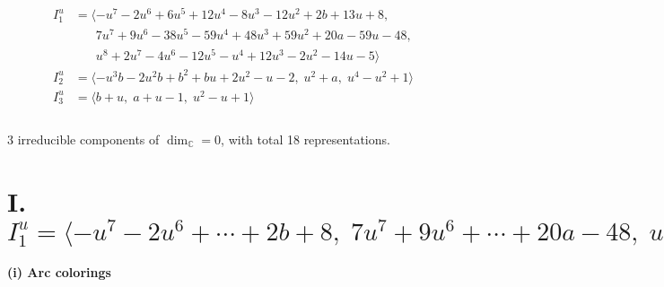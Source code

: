 \documentclass[1p]{elsarticle_modified}
\theoremstyle{definition}
\begin{document}
\begin{align*}
I^u_{1}&=\langle 
- u^7-2 u^6+6 u^5+12 u^4-8 u^3-12 u^2+2 b+13 u+8,\\
\phantom{I^u_{1}}&\phantom{= \langle  }7 u^7+9 u^6-38 u^5-59 u^4+48 u^3+59 u^2+20 a-59 u-48,\\
\phantom{I^u_{1}}&\phantom{= \langle  }u^8+2 u^7-4 u^6-12 u^5- u^4+12 u^3-2 u^2-14 u-5\rangle \\
I^u_{2}&=\langle 
- u^3 b-2 u^2 b+b^2+b u+2 u^2- u-2,\;u^2+a,\;u^4- u^2+1\rangle \\
I^u_{3}&=\langle 
b+u,\;a+u-1,\;u^2- u+1\rangle \\
\\
\end{align*}
\raggedright * 3 irreducible components of $\dim_{\mathbb{C}}=0$, with total 18 representations.\\
\newpage
\renewcommand{\arraystretch}{1}
\centering \section*{I. $I^u_{1}= \langle - u^7-2 u^6+\cdots+2 b+8,\;7 u^7+9 u^6+\cdots+20 a-48,\;u^8+2 u^7+\cdots-14 u-5 \rangle$}
\flushleft \textbf{(i) Arc colorings}\\
\end{document}
